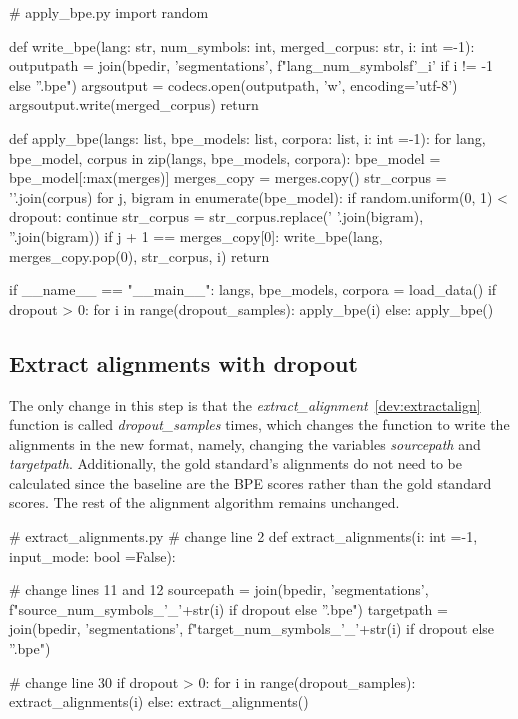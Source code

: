 \begin{python}
# apply_bpe.py
import random

def write_bpe(lang: str, num_symbols: int, merged_corpus: str, i: int =-1):
  outputpath = join(bpedir, 'segmentations', f"{lang}_{num_symbols}{f'_{i}' if i != -1 else ''}.bpe")
  argsoutput = codecs.open(outputpath, 'w', encoding='utf-8')
  argsoutput.write(merged_corpus)
  return

def apply_bpe(langs: list, bpe_models: list, corpora: list, i: int =-1):
  for lang, bpe_model, corpus in zip(langs, bpe_models, corpora):
    bpe_model = bpe_model[:max(merges)]
    merges_copy = merges.copy()
    str_corpus = '\n'.join(corpus)
    for j, bigram in enumerate(bpe_model):
      if random.uniform(0, 1) < dropout:
        continue
      str_corpus = str_corpus.replace(' '.join(bigram), ''.join(bigram))
      if j + 1 == merges_copy[0]:
        write_bpe(lang, merges_copy.pop(0), str_corpus, i)
  return

if __name__ == "__main__":
  langs, bpe_models, corpora = load_data()
  if dropout > 0:
    for i in range(dropout_samples):
      apply_bpe(i)
  else:
      apply_bpe()
\end{python}

\subsection{Extract alignments with dropout}

The only change in this step is that the \emph{extract\_alignment}~\ref{dev:extractalign} function is called \emph{dropout\_samples} times, which changes the function to write the alignments in the new format, namely, changing the variables \emph{sourcepath} and \emph{targetpath}. Additionally, the gold standard's alignments do not need to be calculated since the baseline are the BPE scores rather than the gold standard scores. The rest of the alignment algorithm remains unchanged.

\begin{python}
# extract_alignments.py
# change line 2
def extract_alignments(i: int =-1, input_mode: bool =False):

# change lines 11 and 12
sourcepath = join(bpedir, 'segmentations', f"{source}_{num_symbols}_{'_'+str(i) if dropout else ''}.bpe")
targetpath = join(bpedir, 'segmentations', f"{target}_{num_symbols}_{'_'+str(i) if dropout else ''}.bpe")

# change line 30
if dropout > 0:
  for i in range(dropout_samples):
    extract_alignments(i)
else:
  extract_alignments()
\end{python}

